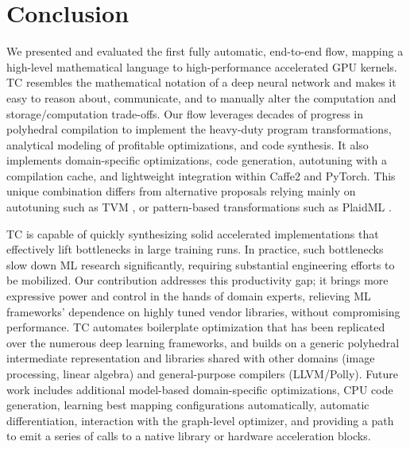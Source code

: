 \section{Conclusion}
We presented and evaluated the first fully automatic, end-to-end flow,
mapping a high-level mathematical language to high-performance
accelerated GPU kernels. TC resembles the mathematical notation of a
deep neural network and makes it easy to reason about, communicate,
and to manually alter the computation and storage/computation
trade-offs. Our flow leverages decades of progress in polyhedral
compilation to implement the heavy-duty program transformations,
analytical modeling of profitable optimizations, and code
synthesis. It also implements domain-specific optimizations, code
generation, autotuning with a compilation cache, and lightweight
integration within Caffe2 and PyTorch. This unique combination differs
from alternative proposals relying mainly on autotuning
such as TVM \cite{autotvm}, or
pattern-based transformations such as PlaidML \cite{PlaidML}.

TC is capable of quickly synthesizing solid accelerated implementations
that effectively lift bottlenecks in large training runs. In practice,
such bottlenecks slow down ML research significantly, requiring
substantial engineering efforts to be mobilized. Our contribution
addresses this productivity gap; it brings more expressive power and
control in the hands of domain experts, relieving ML frameworks'
dependence on highly tuned vendor libraries, without compromising
performance.  TC automates boilerplate optimization that has been
replicated over the numerous deep learning frameworks, and builds on a
generic polyhedral intermediate representation and libraries shared
with other domains (image processing, linear algebra) and
general-purpose compilers (LLVM/Polly).  Future work includes
additional model-based domain-specific optimizations, CPU code
generation, learning best mapping configurations automatically,
automatic differentiation, interaction with the graph-level optimizer,
and providing a path to emit a series of calls to a native library or
hardware acceleration blocks.
